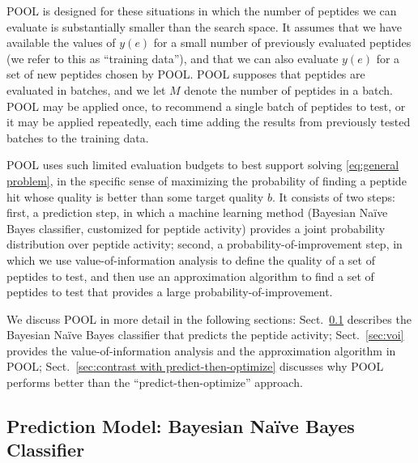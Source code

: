 POOL is designed for these situations in which the number of peptides we can evaluate is substantially smaller than the search space.  
It assumes that we have available the values of $y(e)$ for a small number of previously evaluated peptides (we refer to this as ``training data''), and that we can also evaluate $y(e)$ for a set of new peptides chosen by POOL.  POOL supposes that peptides are evaluated in batches, and we let $M$ denote the number of peptides in a batch.  POOL may be applied once, to recommend a single batch of peptides to test, or it may be applied repeatedly, each time adding the results from previously tested batches to the training data.


POOL uses such limited evaluation budgets to best support solving \eqref{eq:general problem}, in the specific sense of maximizing the probability of finding a peptide hit whose quality is better than some target quality $b$.
It consists of two steps: first, a prediction step, in which a machine learning method (Bayesian Na{\"i}ve Bayes classifier, customized for peptide activity) provides a joint probability distribution over peptide activity; second, a probability-of-improvement step, in which we use value-of-information analysis to define the quality of a set of peptides to test, and then use an approximation algorithm to find a set of peptides to test that provides a large probability-of-improvement.

We discuss POOL in more detail in the following sections: Sect.~\ref{sec:model} describes the Bayesian Na{\"i}ve Bayes classifier that predicts the peptide activity;
Sect.~\ref{sec:voi} provides the value-of-information analysis and the approximation algorithm in POOL;
Sect.~\ref{sec:contrast with predict-then-optimize} discusses why POOL performs better than the ``predict-then-optimize'' approach.

\subsection{Prediction Model: Bayesian Na{\"i}ve Bayes Classifier}  \label{sec:model}

